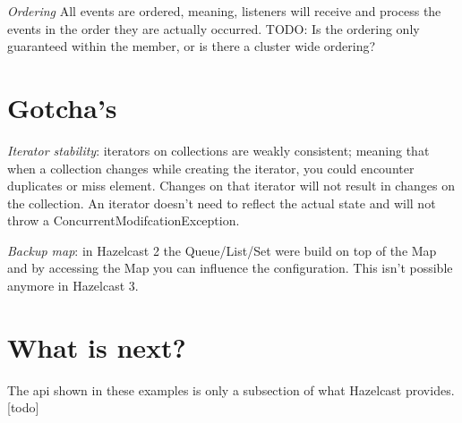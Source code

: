 \emph{Ordering} All events are ordered, meaning, listeners will receive and process the events in the order they are actually occurred. TODO: Is the ordering only guaranteed within the member, or is there a cluster wide ordering?

\section{Gotcha's}
\emph{Iterator stability}: iterators on collections are weakly consistent; meaning that when a collection changes while creating the iterator, you could encounter duplicates or miss element. Changes on that iterator will not result in changes on the collection. An iterator doesn't need to reflect the actual state and will not throw a ConcurrentModifcationException. 

\emph{Backup map}: in Hazelcast 2 the Queue/List/Set were build on top of the Map and by accessing the Map you can influence the configuration. This isn't possible anymore in Hazelcast 3.

\section{What is next?}
The api shown in these examples is only a subsection of what Hazelcast provides.[todo]